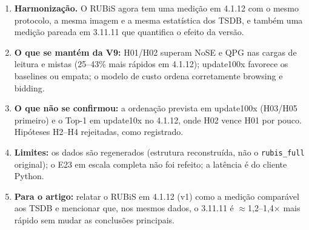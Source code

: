 \begin{enumerate}
\item \textbf{Harmonização.} O RUBiS agora tem uma medição em 4.1.12 com o mesmo protocolo, a mesma imagem e a mesma estatística dos TSDB, e também uma medição pareada em 3.11.11 que quantifica o efeito da versão.
\item \textbf{O que se mantém da V9:} H01/H02 superam NoSE e QPG nas cargas de leitura e mistas (25--43\% mais rápidos em 4.1.12); update100x favorece os baselines ou empata; o modelo de custo ordena corretamente browsing e bidding.
\item \textbf{O que não se confirmou:} a ordenação prevista em update100x (H03/H05 primeiro) e o Top-1 em update10x no 4.1.12, onde H02 vence H01 por pouco. Hipóteses H2--H4 rejeitadas, como registrado.
\item \textbf{Limites:} os dados são regenerados (estrutura reconstruída, não o \texttt{rubis\_full} original); o E23 em escala completa não foi refeito; a latência é do cliente Python.
\item \textbf{Para o artigo:} relatar o RUBiS em 4.1.12 (v1) como a medição comparável aos TSDB e mencionar que, nos mesmos dados, o 3.11.11 é $\approx$1,2--1,4$\times$ mais rápido sem mudar as conclusões principais.
\end{enumerate}
